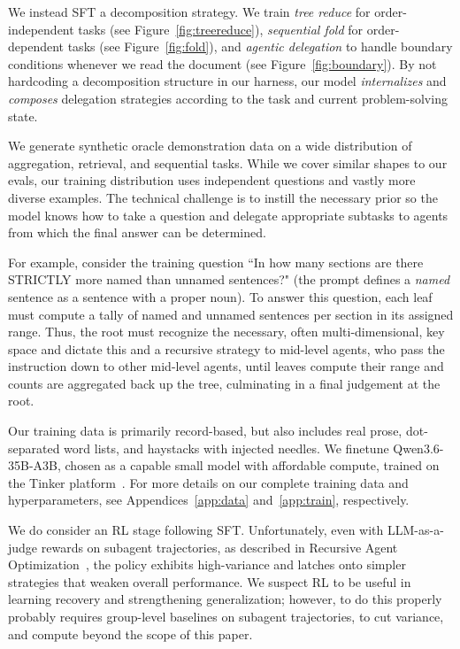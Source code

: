 We instead SFT a decomposition strategy. We train \emph{tree reduce} for order-independent tasks (see Figure~\ref{fig:treereduce}), \emph{sequential fold} for order-dependent tasks (see Figure~\ref{fig:fold}), and \emph{agentic delegation} to handle boundary conditions whenever we read the document (see Figure~\ref{fig:boundary}).
By not hardcoding a decomposition structure in our harness, our model \emph{internalizes} and \emph{composes} delegation strategies according to the task and current problem-solving state.




We generate synthetic oracle demonstration data on a wide distribution of aggregation, retrieval, and sequential tasks. While we cover similar shapes to our evals, our training distribution uses independent questions and vastly more diverse examples. The technical challenge is to instill the necessary prior so the model knows how to take a question and delegate appropriate subtasks to agents from which the final answer can be determined.

For example, consider the training question ``In how many sections are there STRICTLY more named than unnamed sentences?" (the prompt defines a \emph{named} sentence as a sentence with a proper noun). To answer this question, each leaf must compute a tally of named and unnamed sentences per section in its assigned range. Thus, the root must recognize the necessary, often multi-dimensional, key space and dictate this and a recursive strategy to mid-level agents, who pass the instruction down to other mid-level agents, until leaves compute their range and counts are aggregated back up the tree, culminating in a final judgement at the root.

Our training data is primarily record-based, but also includes real prose, dot-separated word lists, and haystacks with injected needles. We finetune Qwen3.6-35B-A3B, chosen as a capable small model with affordable compute, trained on the Tinker platform~\citep{thinkingmachines2025tinker,thinkingmachines2025tinkercookbook}. For more details on our complete training data and hyperparameters, see Appendices~\ref{app:data} and~\ref{app:train}, respectively.

We do consider an RL stage following SFT. Unfortunately, even with LLM-as-a-judge rewards on subagent trajectories, as described in Recursive Agent Optimization~\citep{gandhi2026rao}, the policy exhibits high-variance and latches onto simpler strategies that weaken overall performance. We suspect RL to be useful in learning recovery and strengthening generalization; however, to do this properly probably requires group-level baselines on subagent trajectories, to cut variance, and compute beyond the scope of this paper.
 

